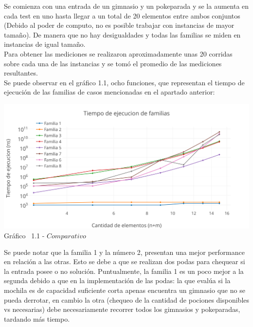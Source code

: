 Se comienza con una entrada de un gimnasio y un pokeparada y se la aumenta en cada test en uno hasta llegar a un total de 20 elementos entre ambos conjuntos (Debido al poder de computo, no es posible trabajar con instancias de mayor tamaño). De manera que no hay desigualdades y todas las familias se miden en instancias de igual tamaño.\\

Para obtener las mediciones se realizaron aproximadamente unas 20 corridas sobre cada una de las instancias y se tom\'o el promedio de las mediciones resultantes.\\ 

Se puede observar en el  gráfico 1.1, ocho funciones, que representan el tiempo de ejecuci\'on de las familias de casos mencionadas en el apartado anterior:\\


\vspace*{0.3cm} \vspace*{0.3cm}
  \begin{center}
 \includegraphics[scale=0.65]{./EJ1/comparativo.png}
 {Gr\'afico \ 1.1 - $Comparativo$}
  \end{center}
  \vspace*{0.3cm}

  
Se puede notar que la familia 1 y la n\'umero 2, presentan una mejor performance en relaci\'on a las otras. Esto se debe a que se realizan dos podas para chequear si la entrada posee o no soluci\'on. Puntualmente, la familia 1 es un poco mejor a la segunda debido a que en la implementaci\'on de las podas: la que evalúa si la mochila es de capacidad suficiente corta apenas encuentra un gimnasio que no se pueda derrotar, en cambio la otra (chequeo de la cantidad de pociones disponibles vs necesarias) debe necesariamente recorrer todos los gimnasios y pokeparadas, tardando más tiempo.

